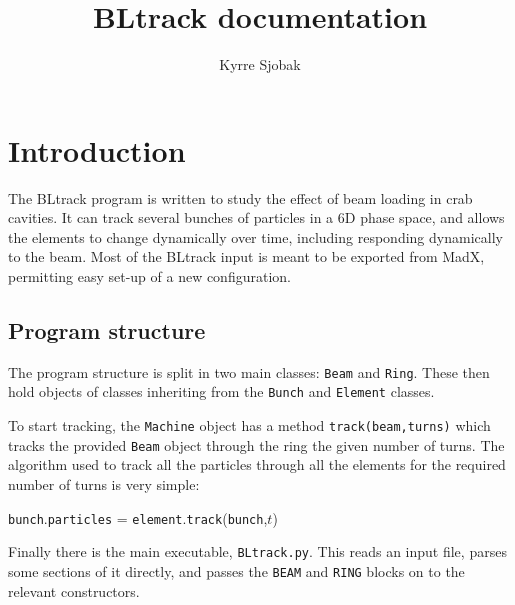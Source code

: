 \documentclass[a4paper]{report}
\title{BLtrack documentation}
\author{Kyrre Sjobak}
\begin{document}
\maketitle
\newpage
\tableofcontents

\chapter{Introduction}

The BLtrack program is written to study the effect of beam loading in crab cavities.
It can track several bunches of particles in a 6D phase space, and allows the elements to change dynamically over time, including responding dynamically to the beam.
Most of the BLtrack input is meant to be exported from MadX, permitting easy set-up of a new configuration.

\section{Program structure}
The program structure is split in two main classes: \texttt{Beam} and \texttt{Ring}.
These then hold objects of classes inheriting from the \texttt{Bunch} and \texttt{Element} classes.

To start tracking, the \texttt{Machine} object has a method \texttt{track(beam,turns)} which tracks the provided \texttt{Beam} object through the ring the given number of turns.
The algorithm used to track all the particles through all the elements for the required number of turns is very simple:
\begin{algorithmic}
        \STATE \texttt{bunch}.\texttt{particles} = \texttt{element}.\texttt{track}(\texttt{bunch},$t$)
      \ENDFOR
    \ENDFOR
  \ENDFOR
\end{algorithmic}

Finally there is the main executable, \texttt{BLtrack.py}.
This reads an input file, parses some sections of it directly, and passes the \texttt{BEAM} and \texttt{RING} blocks on to the relevant constructors.
\end{document}
